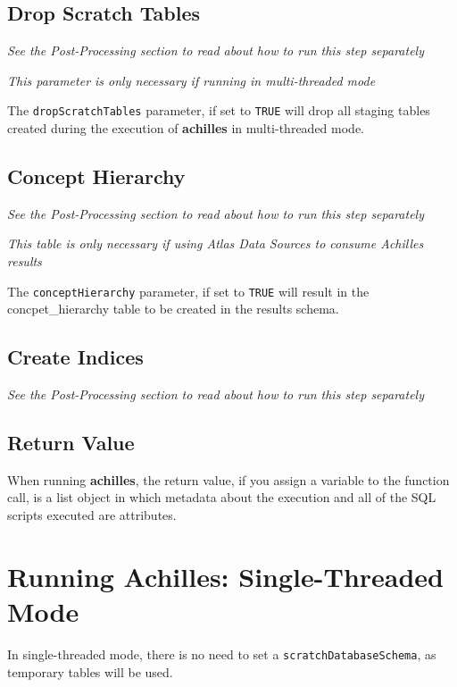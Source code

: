 \documentclass[]{article}
\begin{document}
\subsection{Drop Scratch Tables}\label{drop-scratch-tables}

\emph{See the Post-Processing section to read about how to run this step
separately}

\emph{This parameter is only necessary if running in multi-threaded
mode}

The \texttt{dropScratchTables} parameter, if set to \texttt{TRUE} will
drop all staging tables created during the execution of
\textbf{achilles} in multi-threaded mode.

\subsection{Concept Hierarchy}\label{concept-hierarchy}

\emph{See the Post-Processing section to read about how to run this step
separately}

\emph{This table is only necessary if using Atlas Data Sources to
consume Achilles results}

The \texttt{conceptHierarchy} parameter, if set to \texttt{TRUE} will
result in the concpet\_hierarchy table to be created in the results
schema.

\subsection{Create Indices}\label{create-indices}

\emph{See the Post-Processing section to read about how to run this step
separately}

\subsection{Return Value}\label{return-value}

When running \textbf{achilles}, the return value, if you assign a
variable to the function call, is a list object in which metadata about
the execution and all of the SQL scripts executed are attributes.

\section{Running Achilles: Single-Threaded
Mode}\label{running-achilles-single-threaded-mode}

In single-threaded mode, there is no need to set a
\texttt{scratchDatabaseSchema}, as temporary tables will be used.
\end{document}
